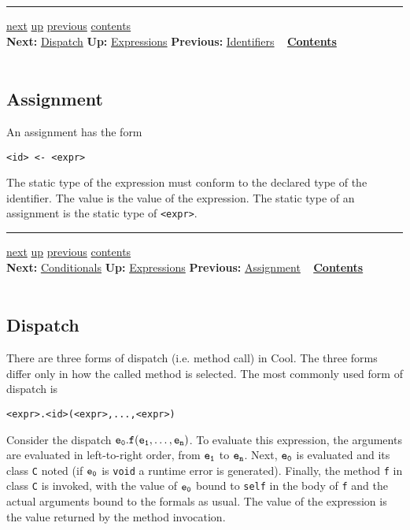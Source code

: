 \documentclass[]{article}
\begin{document}
\begin{center}\rule{3in}{0.4pt}\end{center}

\href{node17.html}{next} \href{node13.html}{up}
\href{node15.html}{previous} \href{node1.html}{contents} \\
\textbf{Next:} \href{node17.html}{Dispatch} \textbf{Up:}
\href{node13.html}{Expressions} \textbf{Previous:}
\href{node15.html}{Identifiers} ~ \textbf{\href{node1.html}{Contents}}
\\ \\

\subsection{Assignment}

An assignment has the form

\begin{verbatim}
<id> <- <expr>
\end{verbatim}

The static type of the expression must conform to the declared type of
the identifier. The value is the value of the expression. The static
type of an assignment is the static type of
\texttt{\textless{}expr\textgreater{}}.

\begin{center}\rule{3in}{0.4pt}\end{center}

\href{node18.html}{next} \href{node13.html}{up}
\href{node16.html}{previous} \href{node1.html}{contents} \\
\textbf{Next:} \href{node18.html}{Conditionals} \textbf{Up:}
\href{node13.html}{Expressions} \textbf{Previous:}
\href{node16.html}{Assignment} ~ \textbf{\href{node1.html}{Contents}} \\
\\

\subsection{Dispatch}

There are three forms of dispatch (i.e. method call) in Cool. The three
forms differ only in how the called method is selected. The most
commonly used form of dispatch is

\begin{verbatim}
<expr>.<id>(<expr>,...,<expr>)
\end{verbatim}

Consider the dispatch $\tt e_0.f(e_1,\ldots,e_n)$. To evaluate this
expression, the arguments are evaluated in left-to-right order, from
$\tt e_1$ to $\tt e_n$. Next, $\tt e_0$ is evaluated and its class
\texttt{C} noted (if $\tt e_0$ is \texttt{void} a runtime error is
generated). Finally, the method \texttt{f} in class \texttt{C} is
invoked, with the value of $\tt e_0$ bound to \texttt{self} in the body
of \texttt{f} and the actual arguments bound to the formals as usual.
The value of the expression is the value returned by the method
invocation.
\end{document}
